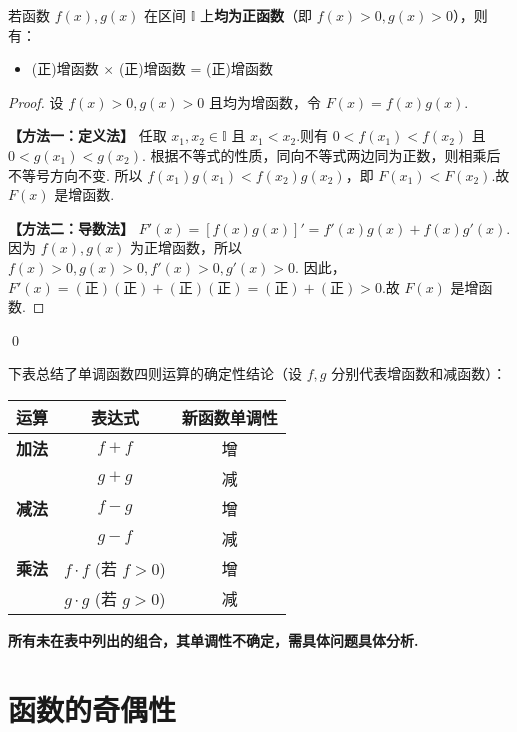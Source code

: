 \begin{theorem}
	若函数 $f(x), g(x)$ 在区间 $\mathbb{I}$ 上\textbf{均为正函数}（即 $f(x)>0, g(x)>0$），则有：
	\begin{itemize}
		\item (正)增函数 $\times$ (正)增函数 = (正)增函数
	\end{itemize}
\end{theorem}
\begin{proof}
	设 $f(x)>0, g(x)>0$ 且均为增函数，令 $F(x) = f(x)g(x)$.
	
	\textbf{【方法一：定义法】}
	任取 $x_1, x_2 \in \mathbb{I}$ 且 $x_1 < x_2$.则有 $0 < f(x_1) < f(x_2)$ 且 $0 < g(x_1) < g(x_2)$.
	根据不等式的性质，同向不等式两边同为正数，则相乘后不等号方向不变.
	所以 $f(x_1)g(x_1) < f(x_2)g(x_2)$，即 $F(x_1) < F(x_2)$.故 $F(x)$ 是增函数.
	
	\textbf{【方法二：导数法】}
	$F'(x) = [f(x)g(x)]' = f'(x)g(x) + f(x)g'(x)$.
	因为 $f(x), g(x)$ 为正增函数，所以 $f(x)>0, g(x)>0, f'(x)>0, g'(x)>0$.
	因此，$F'(x) = (\text{正})(\text{正}) + (\text{正})(\text{正}) = (\text{正})+(\text{正}) > 0$.故 $F(x)$ 是增函数.
\end{proof}
\qed

\begin{note}[结论总结表]
	下表总结了单调函数四则运算的确定性结论（设 $f, g$ 分别代表增函数和减函数）：
	\begin{center}
		\begin{tabular}{ccc}
			\toprule
			\textbf{运算} & \textbf{表达式} & \textbf{新函数单调性} \\
			\midrule
			\textbf{加法} & $f+f$ & 增 \\
			& $g+g$ & 减 \\
			\midrule
			\textbf{减法} & $f-g$ & 增 \\
			& $g-f$ & 减 \\
			\midrule
			\textbf{乘法} & $f \cdot f$ (若 $f>0$) & 增 \\
			& $g \cdot g$ (若 $g>0$) & 减 \\
			\bottomrule
		\end{tabular}
	\end{center}
	\textbf{所有未在表中列出的组合，其单调性不确定，需具体问题具体分析.}
\end{note}

\section{函数的奇偶性}


